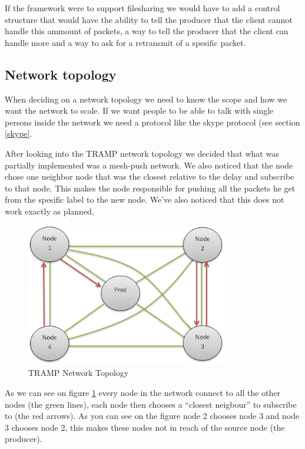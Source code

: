 If the framework were to support filesharing we would have to add a control structure that would have the ability to tell the producer that the client cannot handle this ammount of packets, a way to tell the producer that the client can handle more and a way to ask for a retransmit of a spesific packet.

\subsection{Network topology}
When deciding on a network topology we need to know the scope and how we want the network to scale. If we want people to be able to talk with single persons inside the network we need a protocol like the skype protocol (see section \ref{skype}.

After looking into the TRAMP network topology we decided that what was partially implemented was a mesh-push network. We also noticed that the node chose one neighbor node that was the closest relative to the delay and subscribe to that node. This makes the node responsible for pushing all the packets he get from the spesific label to the new node. We've also noticed that this does not work exactly as planned, 

\begin{center}
 \begin{figure}[h!]
  \includegraphics[width=250pt]{TrampNetworkTopology.png}
  \caption{TRAMP Network Topology}
  \label{tramp_topology}
 \end{figure}
\end{center}

As we can see on figure \ref{tramp_topology} every node in the network connect to all the other nodes (the green lines), each node then chooses a ``closest neigbour'' to subscribe to (the red arrows). As you can see on the figure node 2 chooses node 3 and node 3 chooses node 2, this makes these nodes not in reach of the source node (the producer).


